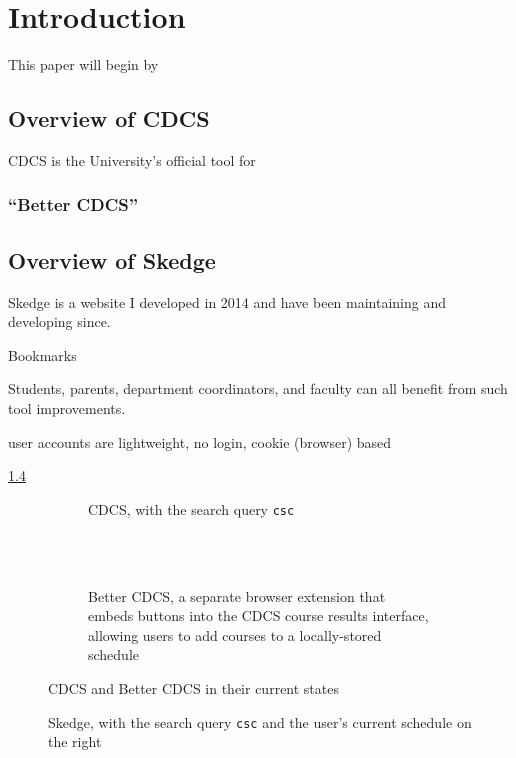 
\chapter{Introduction}

This paper will begin by 

\section{Overview of CDCS}

CDCS is the University's official tool for 

\label{fig:cdcs-index}

\subsection{``Better CDCS''}


\section{Overview of Skedge}

Skedge is a website I developed in 2014 and have been maintaining and developing since.

Bookmarks

Students, parents, department coordinators, and faculty can all benefit from such tool improvements.

user accounts are lightweight, no login, cookie (browser) based

\ref{fig:sk-index}


\begin{figure}[ht]
    \centering
        \begin{subfigure}[h]{14cm}
            \centering
            \caption{CDCS, with the search query {\tt csc}}
            \label{fig:cdcs-index}
        \end{subfigure}\\
        \vspace{10pt}\\
        \begin{subfigure}[h]{14cm}
            \centering
            \caption{Better CDCS, a separate browser extension that embeds buttons into the CDCS course results interface, allowing users to add courses to a locally-stored schedule}
            \label{fig:cdcs-better}
        \end{subfigure}
    \caption{CDCS and Better CDCS in their current states}
\end{figure}

\begin{figure}[ht]
    \centering
    \caption{Skedge, with the search query {\tt csc} and the user's current schedule on the right}
    \label{fig:sk-index}
\end{figure}